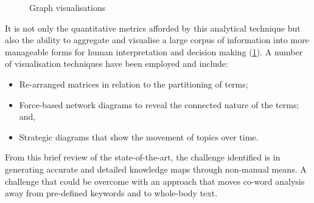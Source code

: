 \documentclass[a4paper, 11pt]{article}
\begin{document}
\begin{figure}
    \hfill
    \hfill
    \caption{Graph visualisations}
    \label{fig:graph-viz}
\end{figure}

It is not only the quantitative metrics afforded by this analytical technique but also the ability to aggregate and visualise a large corpus of information into more manageable forms for human interpretation and decision making (\cref{fig:graph-viz}).
A number of visualisation techniques have been employed and include:

\begin{itemize}
  \item Re-arranged matrices in relation to the partitioning of terms;
  \item Force-based network diagrams to reveal the connected nature of the terms; and,
  \item Strategic diagrams that show the movement of topics over time.
\end{itemize}

From this brief review of the state-of-the-art, the challenge identified is in generating accurate and detailed knowledge maps through non-manual means.
A challenge that could be overcome with an approach that moves co-word analysis away from pre-defined keywords and to whole-body text.
\end{document}
